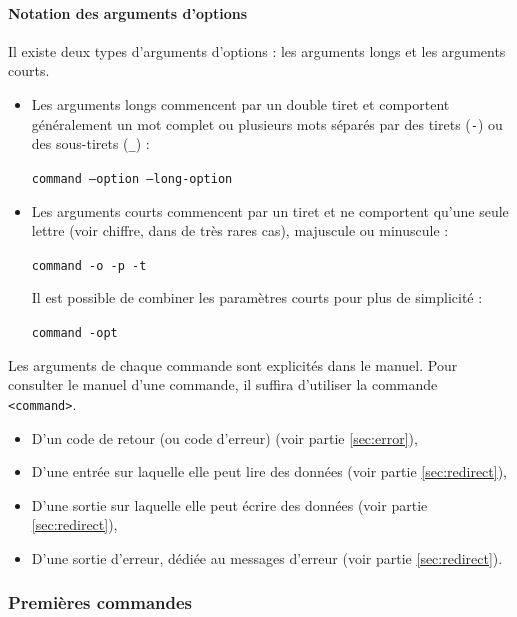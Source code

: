\paragraph{Notation des arguments d'options}

Il existe deux types d'arguments d'options : les arguments longs et les arguments courts.
\begin{itemize}
    \item Les arguments longs commencent par un double tiret et comportent généralement un mot complet ou plusieurs mots séparés par des tirets (\texttt{-}) ou des sous-tirets (\texttt{\_}) :
        \begin{center}\texttt{command --option --long-option}\end{center} \vspace{\baselineskip}
    \item Les arguments courts commencent par un tiret et ne comportent qu'une seule lettre (voir chiffre, dans de très rares cas), majuscule ou minuscule :
        \begin{center}\texttt{command -o -p -t}\end{center} \vspace{\baselineskip}
    Il est possible de combiner les paramètres courts pour plus de simplicité :
        \begin{center}\texttt{command -opt}\end{center}
\end{itemize}
\bigskip

Les arguments de chaque commande sont explicités dans le manuel. Pour consulter le manuel d'une commande, il suffira d'utiliser la commande \texttt{ <command>}.

\begin{itemize}
    \item D'un code de retour (ou code d'erreur) (voir partie \ref{sec:error}),
    \item D'une entrée sur laquelle elle peut lire des données (voir partie \ref{sec:redirect}),
    \item D'une sortie sur laquelle elle peut écrire des données (voir partie \ref{sec:redirect}),
    \item D'une sortie d'erreur, dédiée au messages d'erreur (voir partie \ref{sec:redirect}).
\end{itemize}

\subsubsection{Premières commandes}

